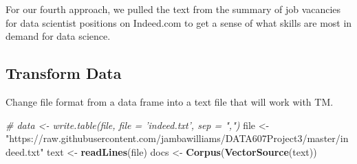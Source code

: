 \documentclass[]{article}
\newenvironment{Shaded}{\begin{snugshade}}{\end{snugshade}}
\newcommand{\CommentTok}[1]{\textcolor[rgb]{0.56,0.35,0.01}{\textit{#1}}}
\newcommand{\ControlFlowTok}[1]{\textcolor[rgb]{0.13,0.29,0.53}{\textbf{#1}}}
\newcommand{\DataTypeTok}[1]{\textcolor[rgb]{0.13,0.29,0.53}{#1}}
\newcommand{\DecValTok}[1]{\textcolor[rgb]{0.00,0.00,0.81}{#1}}
\newcommand{\KeywordTok}[1]{\textcolor[rgb]{0.13,0.29,0.53}{\textbf{#1}}}
\newcommand{\NormalTok}[1]{#1}
\newcommand{\OperatorTok}[1]{\textcolor[rgb]{0.81,0.36,0.00}{\textbf{#1}}}
\newcommand{\OtherTok}[1]{\textcolor[rgb]{0.56,0.35,0.01}{#1}}
\newcommand{\StringTok}[1]{\textcolor[rgb]{0.31,0.60,0.02}{#1}}
\begin{document}
For our fourth approach, we pulled the text from the summary of job
vacancies for data scientist positions on Indeed.com to get a sense of
what skills are most in demand for data science.

\begin{Shaded}
\end{Shaded}

\hypertarget{transform-data}{%
\subsection{Transform Data}\label{transform-data}}

Change file format from a data frame into a text file that will work
with TM.

\begin{Shaded}
\begin{Highlighting}[]
\CommentTok{# data <- write.table(file, file = 'indeed.txt', sep = ",")}
\NormalTok{file <-}\StringTok{ "https://raw.githubusercontent.com/jambawilliams/DATA607Project3/master/indeed.txt"}
\NormalTok{text <-}\StringTok{ }\KeywordTok{readLines}\NormalTok{(file)}
\NormalTok{docs <-}\StringTok{ }\KeywordTok{Corpus}\NormalTok{(}\KeywordTok{VectorSource}\NormalTok{(text))}
\end{Highlighting}
\end{Shaded}
\end{document}
